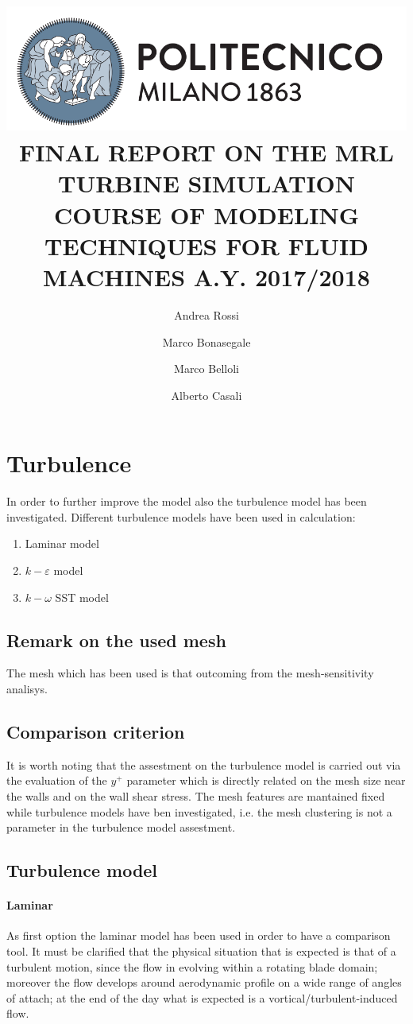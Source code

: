 \documentclass[a4paper,12pt]{article}
\title{
\includegraphics[scale=0.4]{images/logo.png}
\\[1cm]
FINAL REPORT ON THE  MRL TURBINE SIMULATION
COURSE OF MODELING TECHNIQUES FOR FLUID MACHINES 
A.Y. 2017/2018}
\author{
Andrea Rossi \and Marco Bonasegale
\and Marco Belloli \and Alberto Casali
}
\date{}
\begin{document}
\section{Turbulence}
In order to further improve the model also the turbulence model has been investigated.
Different turbulence models have been used in calculation:


\begin{enumerate}
\item Laminar model
\item $k-\varepsilon$ model
\item $k-\omega $ SST model
\end{enumerate}

\subsection{Remark on the used mesh}
The mesh which has been used is that outcoming from the mesh-sensitivity analisys.

\subsection{Comparison criterion}
It is worth noting that the assestment on the turbulence model is carried out via the evaluation of the $y^+ $ parameter which is directly related on the mesh size near the walls and on the wall shear stress.
The mesh features are mantained fixed while turbulence models have ben investigated, i.e. the mesh clustering is not a parameter in the turbulence model assestment.


\subsection{Turbulence model}

\paragraph{Laminar}
As first option the laminar model has been used in order to have a comparison tool.
It must be clarified that the physical situation that is expected is that of a turbulent motion, since the flow in evolving within a rotating blade domain; moreover the flow develops around aerodynamic profile on a wide range of angles of attach; at the end of the day what is expected is a vortical/turbulent-induced flow.\\
 
\end{document}
